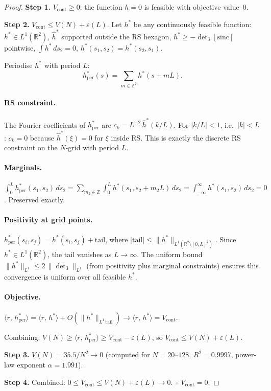\documentclass[10pt]{article}
\begin{document}
\begin{proof}
\textbf{Step 1.} $V_{\mathrm{cont}} \geq 0$: the function $h = 0$ is feasible with
objective value~$0$.

\textbf{Step 2.} $V_{\mathrm{cont}} \leq V(N) + \varepsilon(L)$.
Let $h^*$ be any continuously feasible function:
$h^* \in L^1(\mathbb{R}^2)$, $\hat{h}^*$ supported outside the RS hexagon,
$h^* \geq -\det_3[\mathrm{sinc}]$ pointwise, $\int h^* \, ds_2 = 0$, $h^*(s_1,s_2) = h^*(s_2,s_1)$.

Periodise $h^*$ with period $L$:
\[
h^*_{\mathrm{per}}(s) = \sum_{m \in \mathbb{Z}^2} h^*(s + mL).
\]

\paragraph{RS constraint.}
The Fourier coefficients of $h^*_{\mathrm{per}}$ are $c_k = L^{-2}\,\hat{h}^*(k/L)$.
For $|k/L| < 1$, i.e.\ $|k| < L$: $c_k = 0$ because $\hat{h}^*(\xi) = 0$ for $\xi$
inside RS. This is exactly the discrete RS constraint on the $N$-grid with period $L$.

\paragraph{Marginals.}
$\displaystyle\int_0^L h^*_{\mathrm{per}}(s_1, s_2)\,ds_2
= \sum_{m_2 \in \mathbb{Z}} \int_0^L h^*(s_1, s_2 + m_2 L)\,ds_2
= \int_{-\infty}^{\infty} h^*(s_1, s_2)\,ds_2 = 0$.
Preserved exactly.

\paragraph{Positivity at grid points.}
$h^*_{\mathrm{per}}(s_i, s_j) = h^*(s_i, s_j) + \mathrm{tail}$,
where $|\mathrm{tail}| \leq \|h^*\|_{L^1(\mathbb{R}^2 \setminus [0,L]^2)}$.
Since $h^* \in L^1(\mathbb{R}^2)$, the tail vanishes as $L \to \infty$.
The uniform bound $\|h^*\|_{L^1} \leq 2\,\|\det_3\|_{L^1}$ (from positivity
plus marginal constraints) ensures this convergence is uniform over all
feasible $h^*$.

\paragraph{Objective.}
$\langle r,\, h^*_{\mathrm{per}} \rangle
= \langle r,\, h^* \rangle + O(\|h^*\|_{L^1\,\mathrm{tail}})
\to \langle r,\, h^* \rangle = V_{\mathrm{cont}}.$

Combining: $V(N) \geq \langle r,\, h^*_{\mathrm{per}} \rangle
\geq V_{\mathrm{cont}} - \varepsilon(L)$, so
$V_{\mathrm{cont}} \leq V(N) + \varepsilon(L)$.

\textbf{Step 3.} $V(N) = 35.5/N^2 \to 0$ (computed for $N = 20$--$128$,
$R^2 = 0.9997$, power-law exponent $\alpha = 1.991$).

\textbf{Step 4.} Combined: $0 \leq V_{\mathrm{cont}}
\leq V(N) + \varepsilon(L) \to 0$. \quad $\therefore\; V_{\mathrm{cont}} = 0$.
\end{proof}
\end{document}
